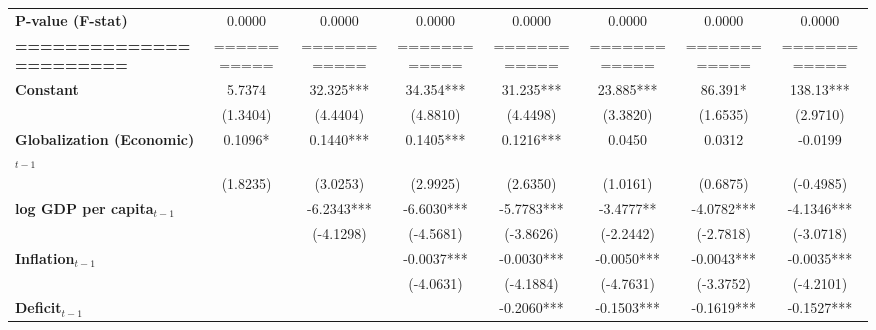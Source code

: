 \begin{center}
\begin{tabular}{lccccccc}
\textbf{P-value (F-stat)}          &       0.0000      &        0.0000        &           0.0000          &       0.0000       &      0.0000     &           0.0000          &            0.0000             \\
\textbf{=======================}   &    ===========    &     ============     &        ============       &    ============    &   ============  &        ============       &         ============          \\
\textbf{Constant}                     &       5.7374      &      32.325***       &         34.354***         &     31.235***      &    23.885***    &          86.391*          &          138.13***            \\
\textbf{ }                         &      (1.3404)     &       (4.4404)       &          (4.8810)         &      (4.4498)      &     (3.3820)    &          (1.6535)         &           (2.9710)            \\
\textbf{Globalization (Economic)$_{t-1}$}             &      0.1096*      &      0.1440***       &         0.1405***         &     0.1216***      &      0.0450     &           0.0312          &           -0.0199             \\
\textbf{ }                         &      (1.8235)     &       (3.0253)       &          (2.9925)         &      (2.6350)      &     (1.0161)    &          (0.6875)         &          (-0.4985)            \\
\textbf{log GDP per capita$_{t-1}$}           &                   &      -6.2343***      &         -6.6030***        &     -5.7783***     &    -3.4777**    &         -4.0782***        &          -4.1346***           \\
\textbf{ }                         &                   &      (-4.1298)       &         (-4.5681)         &     (-3.8626)      &    (-2.2442)    &         (-2.7818)         &          (-3.0718)            \\
\textbf{Inflation$_{t-1}$}      &                   &                      &         -0.0037***        &     -0.0030***     &    -0.0050***   &         -0.0043***        &          -0.0035***           \\
\textbf{ }                         &                   &                      &         (-4.0631)         &     (-4.1884)      &    (-4.7631)    &         (-3.3752)         &          (-4.2101)            \\
\textbf{Deficit$_{t-1}$}             &                   &                      &                           &     -0.2060***     &    -0.1503***   &         -0.1619***        &          -0.1527***           \\

\end{tabular}
\end{center}

